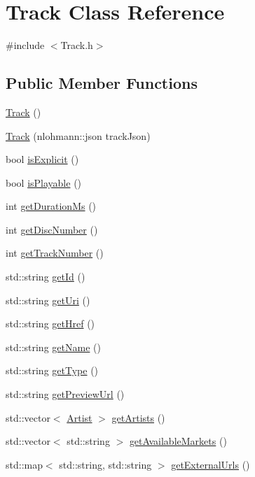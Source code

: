 \hypertarget{class_track}{}\section{Track Class Reference}
\label{class_track}


{\ttfamily \#include $<$Track.\+h$>$}

\subsection*{Public Member Functions}
\begin{DoxyCompactItemize}
\item 
\mbox{\hyperlink{class_track_a11457bcda8be04595018c11173d8241c}{Track}} ()
\item 
\mbox{\hyperlink{class_track_a550f395a3633d7929a6a28cb2d301d1b}{Track}} (nlohmann\+::json track\+Json)
\item 
bool \mbox{\hyperlink{class_track_ade5868ca1e69e508299b74dba0210b24}{is\+Explicit}} ()
\item 
bool \mbox{\hyperlink{class_track_a19e4cc8c2c8dcfe0d8bf765c07ce79c9}{is\+Playable}} ()
\item 
int \mbox{\hyperlink{class_track_a4a80edba869a19b85a47265fabe4d90c}{get\+Duration\+Ms}} ()
\item 
int \mbox{\hyperlink{class_track_a940f7a950d85559a2c221f90eaab4148}{get\+Disc\+Number}} ()
\item 
int \mbox{\hyperlink{class_track_a41073d0003e0f1a3493e35159ebfeb39}{get\+Track\+Number}} ()
\item 
std\+::string \mbox{\hyperlink{class_track_a2368937c06d177b36bf076d97226d0fc}{get\+Id}} ()
\item 
std\+::string \mbox{\hyperlink{class_track_a7b27de9debf1c3150820fed6352bf1f9}{get\+Uri}} ()
\item 
std\+::string \mbox{\hyperlink{class_track_a38774b3b47c36bbf0e3e9de37f965321}{get\+Href}} ()
\item 
std\+::string \mbox{\hyperlink{class_track_a9d39b6060961da7e97f9e8ece26ebb96}{get\+Name}} ()
\item 
std\+::string \mbox{\hyperlink{class_track_af9cd9c3ab48eebe36c1a7863df0949f3}{get\+Type}} ()
\item 
std\+::string \mbox{\hyperlink{class_track_ae2b2effafa262d094cccfa395f7e0588}{get\+Preview\+Url}} ()
\item 
std\+::vector$<$ \mbox{\hyperlink{class_artist}{Artist}} $>$ \mbox{\hyperlink{class_track_a8192c046c7ac1c6c2131d62ab2e979c1}{get\+Artists}} ()
\item 
std\+::vector$<$ std\+::string $>$ \mbox{\hyperlink{class_track_abdbcd6cc1357e70a7a63f522e1a798f7}{get\+Available\+Markets}} ()
\item 
std\+::map$<$ std\+::string, std\+::string $>$ \mbox{\hyperlink{class_track_a9a55f5fee4470234b58869b60554c9db}{get\+External\+Urls}} ()
\end{DoxyCompactItemize}
